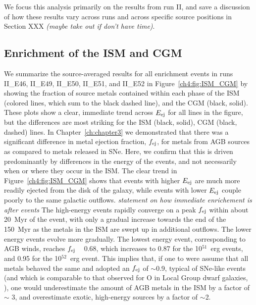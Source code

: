 We focus this analysis primarily on the results from run II, and save a discussion of how these results vary across runs and across specific source positions in Section XXX \textit{(maybe take out if don't have time)}.

\subsection{Enrichment of the ISM and CGM}
\label{ch4:sec:ISM CGM}

We summarize the source-averaged results for all enrichment events in runs II\_E46, II\_E49, II\_E50, II\_E51, and II\_E52 in Figure~\ref{ch4:fig:ISM_CGM} by showing the fraction of source metals contained within each phase of the ISM (colored lines, which sum to the black dashed line), and the CGM (black, solid). These plots show a clear, immediate trend across $E_{\rm ej}$ for all lines in the figure, but the differences are most striking for the ISM (black, solid), CGM (black, dashed) lines. In Chapter~\ref{ch:chapter3}
we demonstrated that there was a significant difference in metal ejection fraction, $f_{\rm ej}$, for metals from AGB sources as compared to metals released in SNe. Here, we confirm that this is driven predominantly by differences in the energy of the events, and not necessarily when or where they occur in the ISM. The clear trend in Figure~\ref{ch4:fig:ISM_CGM} shows that events with higher $E_{\rm ej}$ are much more readily ejected from the disk of the galaxy, while events with lower $E_{\rm ej}$ couple poorly to the same galactic outflows.
\textit{statement on how immediate enrichement is after events}
The high-energy events rapidly converge on a peak $f_{\rm ej}$ within about 20~Myr of the event, with only a gradual increase towards the end of the 150~Myr as the metals in the ISM are swept up in additional outflows. The lower energy events evolve more gradually. The lowest energy event, corresponding to AGB winds, reaches $f_{\rm ej}$ ~ 0.68, which increases to 0.87 for the 10$^{51}$~erg events, and 0.95 for the 10$^{52}$~erg event. This implies that, if one to were assume that all metals behaved the same and adopted an $f_{\rm ej}$ of $\sim$0.9, typical of SNe-like events (and which is comparable to that observed for O in Local Group dwarf galaxies, \citep{Kirby2011,McQuinn2015}), one would underestimate the amount of AGB metals in the ISM by a factor of $\sim$ 3, and overestimate exotic, high-energy sources by a factor of $\sim$2.



